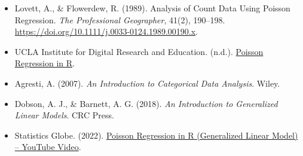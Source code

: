 \documentclass[
  12pt,
]{article}
\begin{document}
\begin{itemize}
\item
  Lovett, A., \& Flowerdew, R. (1989). Analysis of Count Data Using
  Poisson Regression. \emph{The Professional Geographer}, 41(2),
  190--198. \url{https://doi.org/10.1111/j.0033-0124.1989.00190.x}.
\item
  UCLA Institute for Digital Research and Education. (n.d.).
  \href{https://stats.oarc.ucla.edu/r/dae/poisson-regression/}{Poisson
  Regression in R}.
\item
  Agresti, A. (2007). \emph{An Introduction to Categorical Data
  Analysis}. Wiley.\\
\item
  Dobson, A. J., \& Barnett, A. G. (2018). \emph{An Introduction to
  Generalized Linear Models}. CRC Press.
\item
  Statistics Globe. (2022).
  \href{https://www.youtube.com/watch?v=FfBnX5dfxXw&t=334s}{Poisson
  Regression in R (Generalized Linear Model) -- YouTube Video}.
\end{itemize}
\end{document}
